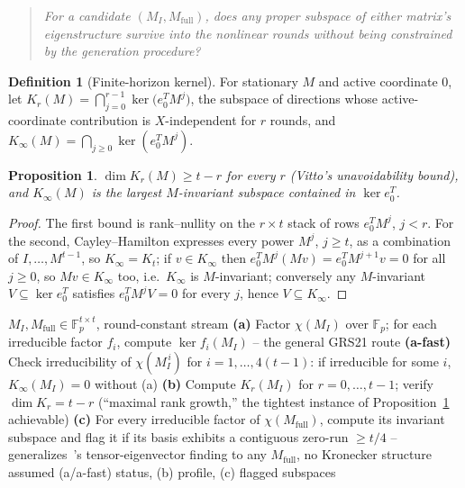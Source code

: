 \documentclass[conference]{IEEEtran}
\theoremstyle{definition}
\newtheorem{definition}{Definition}
\theoremstyle{plain}
\newtheorem{proposition}{Proposition}
\begin{document}
\begin{quote}
\emph{For a candidate $(M_I,M_{\mathrm{full}})$, does any proper subspace
of either matrix's eigenstructure survive into the nonlinear rounds
without being constrained by the generation procedure?}
\end{quote}

\begin{definition}[Finite-horizon kernel]
For stationary $M$ and active coordinate $0$, let
$K_r(M)=\bigcap_{j=0}^{r-1}\ker\big(e_0^{T}M^{j}\big)$, the subspace of
directions whose active-coordinate contribution is $X$-independent for
$r$ rounds, and $K_\infty(M)=\bigcap_{j\ge0}\ker(e_0^T M^j)$.
\end{definition}
\begin{proposition}
\label{prop:kinf}
$\dim K_r(M)\ge t-r$ for every $r$ (Vitto's unavoidability bound), and
$K_\infty(M)$ is the largest $M$-invariant subspace contained in
$\ker e_0^T$.
\end{proposition}
\begin{proof}
The first bound is rank--nullity on the $r\times t$ stack of rows
$e_0^TM^j$, $j<r$. For the second, Cayley--Hamilton expresses every
power $M^j$, $j\ge t$, as a combination of $I,\ldots,M^{t-1}$, so
$K_\infty=K_t$; if $v\in K_\infty$ then $e_0^TM^{j}(Mv)=e_0^TM^{j+1}v=0$
for all $j\ge0$, so $Mv\in K_\infty$ too, i.e.\ $K_\infty$ is
$M$-invariant; conversely any $M$-invariant $V\subseteq\ker e_0^T$
satisfies $e_0^TM^jV=0$ for every $j$, hence $V\subseteq K_\infty$.
\end{proof}

\begin{algorithm}[t]
\small
\caption{Unified structural certificate}
\label{alg:criterion}
\begin{algorithmic}[1]
\Require $M_I, M_{\mathrm{full}}\in\mathbb F_p^{t\times t}$, round-constant stream
\State \textbf{(a)} Factor $\chi(M_I)$ over $\mathbb F_p$; for each irreducible
factor $f_i$, compute $\ker f_i(M_I)$ -- the general GRS21 route
\State \textbf{(a-fast)} Check irreducibility of $\chi(M_I^{\,i})$ for
$i=1,\ldots,4(t-1)$: if irreducible for some $i$, $K_\infty(M_I)=0$
without (a)
\State \textbf{(b)} Compute $K_r(M_I)$ for $r=0,\ldots,t-1$; verify
$\dim K_r=t-r$ (``maximal rank growth,'' the tightest instance of
Proposition~\ref{prop:kinf} achievable)
\State \textbf{(c)} For every irreducible factor of $\chi(M_{\mathrm{full}})$,
compute its invariant subspace and flag it if its basis exhibits a
contiguous zero-run $\ge t/4$ -- generalizes~\cite{cryptoeprint:2026/306}'s
tensor-eigenvector finding to any $M_{\mathrm{full}}$, no Kronecker
structure assumed
\State \Return (a/a-fast) status, (b) profile, (c) flagged subspaces
\end{algorithmic}
\end{algorithm}
\end{document}
